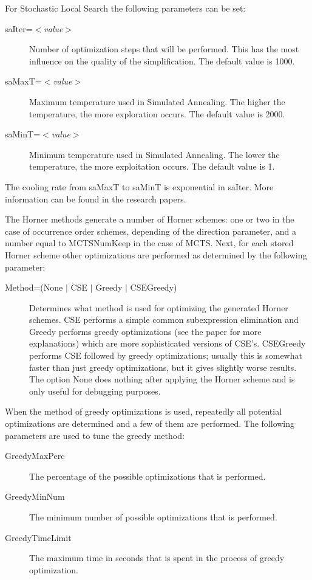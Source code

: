 For Stochastic Local Search the following parameters can be set:
\begin{description}
\item[saIter=$<$\emph{value}$>$] Number of optimization steps that will be performed. This has the most influence on the quality of the simplification. The default value is 1000.
\item[saMaxT=$<$\emph{value}$>$] Maximum temperature used in Simulated Annealing. The higher the temperature,
the more exploration occurs. The default value is 2000.
\item[saMinT=$<$\emph{value}$>$] Minimum temperature used in Simulated Annealing. The lower the temperature,
the more exploitation occurs. The default value is 1.
\end{description}
The cooling rate from saMaxT to saMinT is exponential in saIter. More information can be
found in the research papers.

The Horner methods generate a number of Horner schemes: one or two in
the case of occurrence order schemes, depending of the direction
parameter, and a number equal to MCTSNumKeep in the case of
MCTS\@. Next, for each stored Horner scheme other optimizations are
performed as determined by the following parameter:

\begin{description}
\item[Method=(None $|$ CSE $|$ Greedy $|$ CSEGreedy)] Determines what
method is used for optimizing the generated Horner schemes. 
CSE performs a simple 
common subexpression elimination and Greedy performs greedy 
optimizations (see the paper for more 
explanations) which are more sophisticated versions of CSE's. CSEGreedy 
performs CSE followed by greedy optimizations; usually this is somewhat 
faster than just greedy optimizations, but it gives slightly worse results. 
The option None does nothing after applying the Horner scheme and is only 
useful for debugging purposes.
\end{description}

When the method of greedy optimizations is used, repeatedly all
potential optimizations are determined and a few of them are performed. The 
following parameters are used to tune the greedy method:
\begin{description}
\item[GreedyMaxPerc] The percentage of the possible optimizations that is
  performed.
\item[GreedyMinNum] The minimum number of possible optimizations that
  is performed.
\item[GreedyTimeLimit] The maximum time in seconds that is spent in
  the process of greedy optimization.
\end{description}

